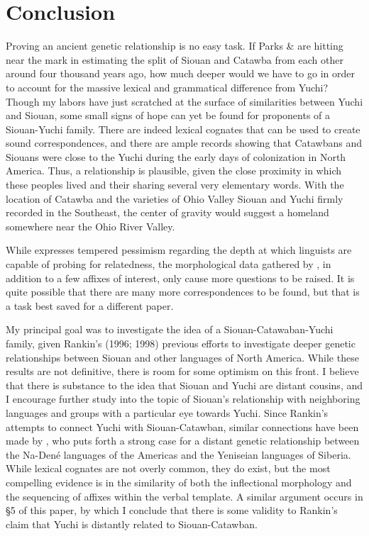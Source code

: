 \documentclass[output=paper]{LSP/langsci}
\begin{document}
{\section{Conclusion}

Proving an ancient genetic relationship is no easy task. If Parks \& \citet{Rankin2001} are hitting near the mark in estimating the split of Siouan and Catawba from each other around four thousand years ago, how much deeper would we have to go in order to account for the massive lexical and grammatical difference from Yuchi? Though my labors have just scratched at the surface of similarities between Yuchi and Siouan, some small signs of hope can yet be found for proponents of a Siouan-Yuchi family. There are indeed lexical cognates that can be used to create sound correspondences, and there are ample records showing that Catawbans and Siouans were close to the Yuchi during the early days of colonization in North America. Thus, a relationship is plausible, given the close proximity in which these peoples lived and their sharing several very elementary words. With the location of Catawba and the varieties of Ohio Valley Siouan and Yuchi firmly recorded in the Southeast, the center of gravity would suggest a homeland somewhere near the Ohio River Valley.

While \citet{Rankin1996} expresses tempered pessimism regarding the depth at which linguists are capable of probing for relatedness, the morphological data gathered by \citet{Rankin1998}, in addition to a few affixes of interest, only cause more questions to be raised. It is quite possible that there are many more correspondences to be found, but that is a task best saved for a different paper.

My principal goal was to investigate the idea of a Siouan-Catawaban-Yuchi family, given Rankin's (1996; 1998) previous efforts to investigate deeper genetic relationships between Siouan and other languages of North America. While these results are not definitive, there is room for some optimism on this front. I believe that there is substance to the idea that Siouan and Yuchi are distant cousins, and I encourage further study into the topic of Siouan's relationship with neighboring languages and groups with a particular eye towards Yuchi. Since Rankin's attempts to connect Yuchi with Siouan-Catawban, similar connections have been made by \citet{Vajda2010}, who puts forth a strong case for a distant genetic relationship between the Na-Den\'e languages of the Americas and the Yeniseian languages of Siberia. While lexical cognates are not overly common, they do exist, but the most compelling evidence is in the similarity of both the inflectional morphology and the sequencing of affixes within the verbal template. A similar argument occurs in \S5 of this paper, by which I conclude that there is some validity to Rankin's claim that Yuchi is distantly related to Siouan-Catawban.

}
\end{document}
